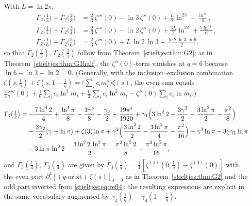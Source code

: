 \begin{corollary}\label{stieltjes:cor:G2even}
With $L=\ln2\pi$,
\begin{align*}
\Gamma_{\!2}\bigl(\tfrac13\bigr)+\Gamma_{\!2}\bigl(\tfrac23\bigr)
&=\tfrac23\,\zeta'''(0)-\ln3\,\zeta''(0)+\tfrac{L}{2}\ln^23+\tfrac{\ln^33}{6},\\
\Gamma_{\!2}\bigl(\tfrac14\bigr)+\Gamma_{\!2}\bigl(\tfrac34\bigr)
&=\tfrac23\,\zeta'''(0)-\ln2\,\zeta''(0)+\tfrac{3L}{2}\ln^22+\tfrac{7\ln^32}{6},\\
\Gamma_{\!2}\bigl(\tfrac16\bigr)+\Gamma_{\!2}\bigl(\tfrac56\bigr)
&=\tfrac23\,\zeta'''(0)+L\,\ln2\,\ln3+\tfrac{\ln2\,\ln3\,\ln6}{2},
\end{align*}
so that $\Gamma_{\!2}(\tfrac23)$, $\Gamma_{\!2}(\tfrac34)$ follow from
Theorem~\ref{stieltjes:thm:G2}; as in Theorem~\ref{stieltjes:thm:G1half}, the $\zeta''(0)$-term
vanishes at $q=6$ because $\ln6-\ln3-\ln2=0$. (Generally, with the
inclusion--exclusion combination
$\zeta(s,\tfrac1q)+\zeta(s,1-\tfrac1q)=\bigl(\sum_ic_im_i^s\bigr)\zeta(s)$,
the even sum equals $\tfrac23\zeta'''(0)+\tfrac16\sum_ic_i\ln^3m_i
+\tfrac{L}{2}\sum_ic_i\ln^2m_i-\zeta''(0)\sum_ic_i\ln m_i$.)
\end{corollary}

\begin{theorem}\label{stieltjes:thm:G3}
\begin{align*}
\Gamma_{\!3}\bigl(\tfrac12\bigr)
&=-\frac{7\ln^4 2}{4}+\frac{\ln^4\pi}{8}-\frac{3\gamma^4}{8}
-\frac{\gamma_3}{2}+\frac{19\pi^4}{1920}
+\gamma_1\Bigl(3\ln^2 2-\frac{3\gamma^2}{2}-\frac{3\ln^2\pi}{2}-\frac{\pi^2}{8}\Bigr)\\
&\quad-\frac{3\gamma_2}{2}(\gamma+\ln\pi)
+\zeta(3)\ln\pi
+\gamma^2\Bigl(\frac{3\ln^2 2}{2}-\frac{3\ln^2\pi}{4}-\frac{\pi^2}{16}\Bigr)
-\gamma^3\ln\pi-3\gamma\gamma_1\ln\pi\\
&\quad-3\ln\pi\,\ln^3 2-\frac{3\ln^2 2\,\ln^2\pi}{2}
-\frac{\pi^2\ln^2 2}{8}+\frac{\pi^2\ln^2\pi}{16},
\end{align*}
and $\Gamma_{\!3}(\tfrac13)$, $\Gamma_{\!3}(\tfrac14)$ are given by
$\Gamma_{\!3}(\tfrac1q)=\tfrac14[\zeta^{(4)}(0,\tfrac1q)-\zeta^{(4)}(0)]$ with
the even part $\partial_s^4[(q\text{-orbit})\,\zeta(s)]_{s=0}$ as in
Theorem~\ref{stieltjes:thm:G2} and the odd part inverted from \eqref{stieltjes:eq:refl4}; the
resulting expressions are explicit in the same vocabulary augmented by
$\gamma_4(\tfrac1q)-\gamma_4(1-\tfrac1q)$.
\end{theorem}

